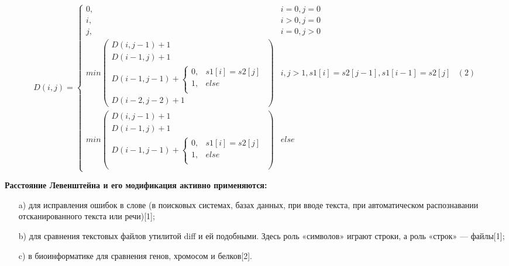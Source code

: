 \documentclass[a4paper,14pt]{article} %
\begin{document}
        $$
        D(i, j) = 
        \left\{
		\begin{array}{lll}
 			0 , & i = 0, j = 0  \\
			i , & i > 0, j = 0  \\
			j , &i = 0, j > 0\\
			min
			\left(
				\begin{array}{lll}
					D(i, j - 1) + 1 \\
					D(i - 1, j ) + 1 \\
					D(i - 1 , j - 1) +  
								\left\{
									\begin{array}{lll}
										0, & s1[i] = s2[j] \\
										1, & else \\
									\end{array}
								\right.\\
					D(i - 2,j - 2) + 1
				\end{array}
			\right) & i, j > 1, s1[i] = s2[j - 1], s1[i - 1] = s2[j]  & (2)\\
			min
			\left(
				\begin{array}{lll}
					D(i, j - 1) + 1 \\
					D(i - 1, j ) + 1 \\
					D(i - 1 , j - 1) +  
								\left\{
									\begin{array}{lll}
										0, & s1[i] = s2[j] \\
										1, & else \\
									\end{array}
								\right.\\
				\end{array}
			\right) &else
 		\end{array}
	\right.
        $$
        \hfill
        
        \textbf{Расстояние Левенштейна и его модификация активно применяются:}
	\begin{enumerate}
		\item[a)] для исправления ошибок в слове (в поисковых системах, базах данных, при вводе текста, при автоматическом распознавании отсканированного текста или речи)[1];
		\item[b)] для сравнения текстовых файлов утилитой diff и ей подобными. Здесь роль «символов» играют строки, а роль «строк» — файлы[1];
		\item[c)]  в биоинформатике для сравнения генов, хромосом и белков[2].
	\end{enumerate}
	
        \hfill
        
\end{document}
